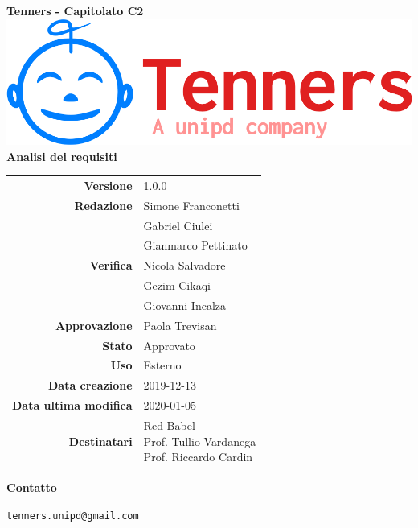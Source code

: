 \begin{titlepage}
	\begin{center}
		\large \textbf{Tenners - Capitolato C2}
		\vfill
		\includegraphics[scale = 0.3]{./res/img/logo.png}\\
		\vfill
		\Huge \textbf{Analisi dei requisiti}

        \vfill
        \large

        \begin{tabular}{r|l}
                        \textbf{Versione} & 1.0.0 \\
                        \textbf{Redazione} &
                        Simone Franconetti\\&
                        Gabriel Ciulei \\&
												Gianmarco Pettinato \\
                        \textbf{Verifica} &
                        Nicola Salvadore \\&
												Gezim Cikaqi \\&
                        Giovanni Incalza \\
                        \textbf{Approvazione} & Paola Trevisan \\
                        \textbf{Stato} & Approvato \\
                        \textbf{Uso} & Esterno\\
                        \textbf{Data creazione} & 2019-12-13\\
                        \textbf{Data ultima modifica} & 2020-01-05\\
                        \textbf{Destinatari} & \parbox[t]{5cm}{Red Babel\\Prof. Tullio Vardanega\\Prof. Riccardo Cardin}
                \end{tabular}
                \vfill
                \normalsize
                \vfill
                \textbf{Contatto}

                \texttt{tenners.unipd@gmail.com}

	\end{center}
\end{titlepage}
